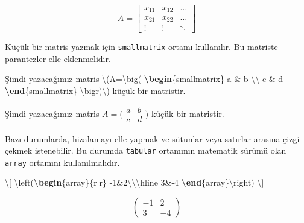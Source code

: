 \documentclass[
  10pt,
]{scrbook}
\newenvironment{Shaded}{\begin{snugshade}}{\end{snugshade}}
\newcommand{\ExtensionTok}[1]{#1}
\newcommand{\KeywordTok}[1]{\textcolor[rgb]{0.13,0.29,0.53}{\textbf{#1}}}
\newcommand{\NormalTok}[1]{#1}
\newcommand{\SpecialCharTok}[1]{\textcolor[rgb]{0.00,0.00,0.00}{#1}}
\newcommand{\SpecialStringTok}[1]{\textcolor[rgb]{0.31,0.60,0.02}{#1}}
\theoremstyle{definition}
\theoremstyle{definition}
\theoremstyle{definition}
\theoremstyle{definition}
\theoremstyle{remark}
\begin{document}
\[
A=
\begin{bmatrix}
x_{11} & x_{12} & \dots \\
x_{21} & x_{22} & \dots \\
\vdots & \vdots & \ddots
\end{bmatrix}
\]

Küçük bir matris yazmak için \texttt{smallmatrix} ortamı kullanılır. Bu matriste parantezler elle eklenmelidir.

\begin{Shaded}
\begin{Highlighting}[]
\NormalTok{Şimdi yazacağımız matris}
\SpecialStringTok{\textbackslash{}(A=}\SpecialCharTok{\textbackslash{}big}\SpecialStringTok{(}
\KeywordTok{\textbackslash{}begin}\NormalTok{\{}\ExtensionTok{smallmatrix}\NormalTok{\}}
\SpecialStringTok{a \& b }\SpecialCharTok{\textbackslash{}\textbackslash{}}
\SpecialStringTok{c \& d}
\KeywordTok{\textbackslash{}end}\NormalTok{\{}\ExtensionTok{smallmatrix}\NormalTok{\}}
\SpecialCharTok{\textbackslash{}bigr}\SpecialStringTok{)\textbackslash{})}
\NormalTok{küçük bir matristir.}
\end{Highlighting}
\end{Shaded}

Şimdi yazacağımız matris \(A=\bigl( \begin{smallmatrix} a & b \\ c & d \end{smallmatrix} \bigr)\) küçük bir matristir.

Bazı durumlarda, hizalamayı elle yapmak ve sütunlar veya satırlar arasına çizgi çekmek istenebilir. Bu durumda \texttt{tabular} ortamının matematik sürümü olan \texttt{array} ortamını kullanılmalıdır.

\begin{Shaded}
\begin{Highlighting}[]
\SpecialStringTok{\textbackslash{}[}
\SpecialCharTok{\textbackslash{}left}\SpecialStringTok{(}\KeywordTok{\textbackslash{}begin}\NormalTok{\{}\ExtensionTok{array}\NormalTok{\}}\SpecialStringTok{\{r|r\}}
\SpecialStringTok{{-}1\&2}\SpecialCharTok{\textbackslash{}\textbackslash{}\textbackslash{}hline}
\SpecialStringTok{3\&{-}4}
\KeywordTok{\textbackslash{}end}\NormalTok{\{}\ExtensionTok{array}\NormalTok{\}}\SpecialCharTok{\textbackslash{}right}\SpecialStringTok{)}
\SpecialStringTok{\textbackslash{}]}
\end{Highlighting}
\end{Shaded}

\[
\left(\begin{array}{r|r}
-1&2\\\hline
3&-4
\end{array}\right)
\]
\end{document}
